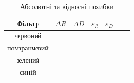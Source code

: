 \begin{table}[h!]
    \centering
    \begin{tabular}{|c|c|c|c|c|c|c|}
        \hline
        \textbf{Фільтр} & \textbf{$\Delta R$} & \textbf{$\Delta D$} &
        \textbf{$\varepsilon_R$} & \textbf{$\varepsilon_D$} \\
        \hline

        червоний &  & & &  \\
        \hline
        
        помаранчевий &  & &  &  \\
        \hline
        
        зелений & &  & &  \\
        \hline

        синій & &  & & \\
        \hline

    \end{tabular}
    \caption{Абсолютні та відносні похибки}
\end{table}